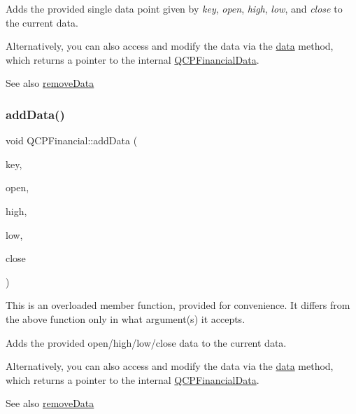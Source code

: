 Adds the provided single data point given by {\itshape key}, {\itshape open}, {\itshape high}, {\itshape low}, and {\itshape close} to the current data.

Alternatively, you can also access and modify the data via the \hyperlink{class_q_c_p_financial_a528c81578e4f25999a9169127763cfd4}{data} method, which returns a pointer to the internal \hyperlink{class_q_c_p_financial_data}{Q\+C\+P\+Financial\+Data}.

\begin{DoxySeeAlso}{See also}
\hyperlink{class_q_c_p_financial_a048c741d3c8cc5709c2c44b759fdf27c}{remove\+Data} 
\end{DoxySeeAlso}
\hypertarget{class_q_c_p_financial_aa1abe3bdafb297497f09cdbdc4db3958}{}\label{class_q_c_p_financial_aa1abe3bdafb297497f09cdbdc4db3958} 
\subsubsection{\texorpdfstring{add\+Data()}{addData()}\hspace{0.1cm}{\footnotesize\ttfamily [4/4]}}
{\footnotesize\ttfamily void Q\+C\+P\+Financial\+::add\+Data (\begin{DoxyParamCaption}\item[{const Q\+Vector$<$ double $>$ \&}]{key,  }\item[{const Q\+Vector$<$ double $>$ \&}]{open,  }\item[{const Q\+Vector$<$ double $>$ \&}]{high,  }\item[{const Q\+Vector$<$ double $>$ \&}]{low,  }\item[{const Q\+Vector$<$ double $>$ \&}]{close }\end{DoxyParamCaption})}

This is an overloaded member function, provided for convenience. It differs from the above function only in what argument(s) it accepts.

Adds the provided open/high/low/close data to the current data.

Alternatively, you can also access and modify the data via the \hyperlink{class_q_c_p_financial_a528c81578e4f25999a9169127763cfd4}{data} method, which returns a pointer to the internal \hyperlink{class_q_c_p_financial_data}{Q\+C\+P\+Financial\+Data}.

\begin{DoxySeeAlso}{See also}
\hyperlink{class_q_c_p_financial_a048c741d3c8cc5709c2c44b759fdf27c}{remove\+Data} 
\end{DoxySeeAlso}
\hypertarget{class_q_c_p_financial_a11fd49928c33e55e27b7319c6927864a}{}\label{class_q_c_p_financial_a11fd49928c33e55e27b7319c6927864a} 
